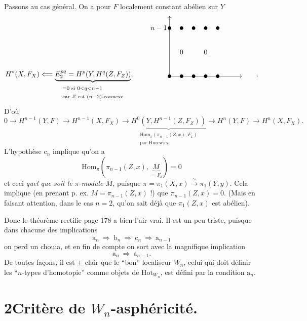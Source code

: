 
Passons au cas général. On a pour $F$ localement constant abélien sur $Y$
\[
H^*(X,F_X) \Longleftarrow \underbrace{E_2^{pq} = H^p(Y,H^q(Z,F_Z))}_{\begin{array}{l}\scriptstyle = 0 \text{ si } 0<q<n-1\\ \scriptstyle \text{car } Z \text{ est } (n-2)\text{-connexe}\end{array}}, \qquad
\begin{tikzpicture}[baseline=0pt, x=0.6cm, y=0.6cm]
\draw[->] (0,0) -- (0,5);
\draw[->] (0,0) -- (6,0);
\node[left] at (0,4) {$n-1$};
\foreach \i in {0,...,4} { \fill (\i,4) circle (2.5pt); \fill (\i,0) circle (2.5pt); }
\node at (1,2) {$0$};
\node at (3,2) {$0$};
\end{tikzpicture}
\qquad ,
\]
D’où
\[
0 \longrightarrow H^{n-1}(Y,F) \longrightarrow H^{n-1}(X,F_X) \longrightarrow \underbrace{H^0(Y,H^{n-1}(Z,F_Z))}_{\begin{array}{l}\scriptstyle \mathrm{Hom}_\pi(\pi_{n-1}(Z,x),F_x)\\ \scriptstyle \text{par Hurewicz}\end{array}} \longrightarrow H^n(Y,F) \longrightarrow H^n(X,F_X).
\]
L’hypothèse $\mathrm{c}_n$ implique qu’on a
\[
\mathrm{Hom}_\pi(\pi_{n-1}(Z,x),\underbrace{M}_{=\,F_x}) = 0
\]
et ceci \textit{quel que soit le $\pi$-module $M$,} puisque $\pi = \pi_1(X,x) \xrightarrow{\ \sim\ } \pi_1(Y,y)$. Cela implique (en prenant p. ex. $M = \pi_{n-1}(Z,x)$ !) que $\pi_{n-1}(Z,x)=0$. (Mais en faisant attention, dans le cas $n=2$, qu’on sait déjà que $\pi_1(Z,x)$ est abélien).

Donc le théorème rectifie page 178 a bien l’air vrai. Il est un peu triste, puisque dans chacune des implications %
\[
\mathrm{a}_n \ \Longrightarrow\ \mathrm{b}_n \ \Longrightarrow\ \mathrm{c}_n \ \Longrightarrow\ \mathrm{a}_{n-1}
\]
on perd un chouia, et en fin de compte on sort avec la magnifique implication
\[
\mathrm{a}_n \ \Longrightarrow\ \mathrm{a}_{n-1}.
\]
De toutes façons, il est $\pm$ clair que le “bon” localiseur $W_n$, celui qui doit définir les “$n$-types d’homotopie” comme objets de $\mathrm{Hot}_{W_n}$, est défini par la condition $\mathrm{a}_n$.

\section*{2\quad Critère de $W_n$-asphéricité.}


